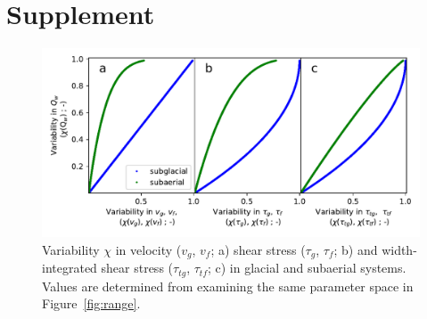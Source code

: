 \documentclass[draft]{agujournal2019}
\begin{document}
\section{Supplement}

\renewcommand{\figurename}{Figure S}
\setcounter{figure}{0}

\begin{center}
  \begin{figure}[H]
    \includegraphics[width=0.8\linewidth]{multi_run_vars.pdf}
    \caption{Variability $\chi$ in velocity ($v_g$, $v_f$; a) shear stress ($\tau_g$, $\tau_f$; b) and width-integrated shear stress ($\tau_{tg}$, $\tau_{tf}$; c)  in glacial and subaerial systems. Values are determined from examining the same parameter space in Figure~\ref{fig:range}. }
    \label{fig:gammas}
  \end{figure}
\end{center}
\end{document}
